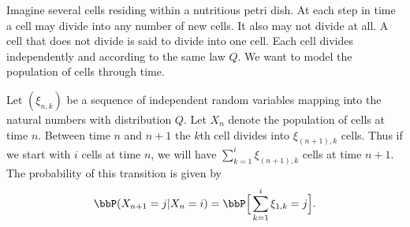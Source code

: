 \documentclass{report}
\begin{document}
\begin{example}
Imagine several cells residing within a nutritious petri dish.  At each step in time a cell may divide into any number of new cells.  It also may not divide at all.  A cell that does not divide is said to divide into one cell.  Each cell divides independently and according to the same law $Q$.  We want to model the population of cells through time.

Let $(\xi_{n,k})$ be a sequence of independent random variables mapping into the natural numbers with distribution $Q$.  Let $X_n$ denote the population of cells at time $n$.  Between time $n$ and $n+1$ the $k$th cell divides into $\xi_{(n+1),k}$ cells.  Thus if we start with $i$ cells at time $n$, we will have $\sum_{k=1}^i \xi_{(n+1),k}$ cells at time $n+1$.  The probability of this transition is given by
\[
\bbP(X_{n+1} = j | X_n = i) = \bbP \Big[ \sum_{k=1}^i \xi_{1,k} = j \Big].
\]
\end{example}
\end{document}

